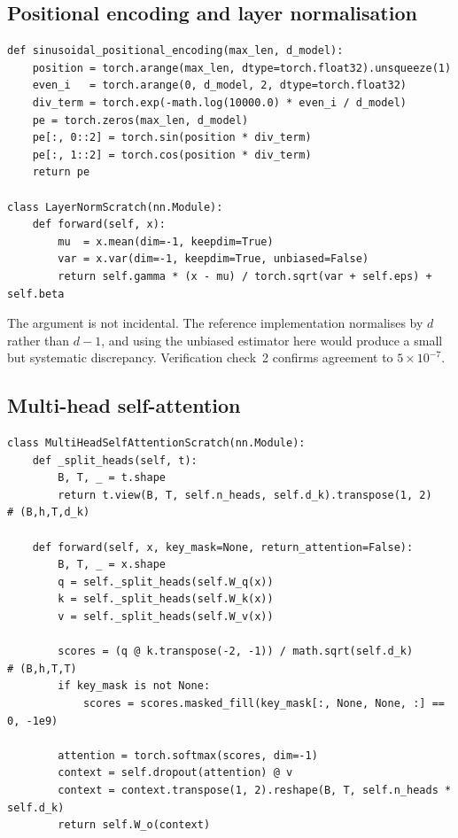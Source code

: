\subsection{Positional encoding and layer normalisation}

{\small
\begin{verbatim}
def sinusoidal_positional_encoding(max_len, d_model):
    position = torch.arange(max_len, dtype=torch.float32).unsqueeze(1)
    even_i   = torch.arange(0, d_model, 2, dtype=torch.float32)
    div_term = torch.exp(-math.log(10000.0) * even_i / d_model)
    pe = torch.zeros(max_len, d_model)
    pe[:, 0::2] = torch.sin(position * div_term)
    pe[:, 1::2] = torch.cos(position * div_term)
    return pe

class LayerNormScratch(nn.Module):
    def forward(self, x):
        mu  = x.mean(dim=-1, keepdim=True)
        var = x.var(dim=-1, keepdim=True, unbiased=False)
        return self.gamma * (x - mu) / torch.sqrt(var + self.eps) + self.beta
\end{verbatim}}

The  argument is not incidental. The reference implementation normalises by
$d$ rather than $d-1$, and using the unbiased estimator here would produce a small but systematic
discrepancy. Verification check~2 confirms agreement to $5\times10^{-7}$.

\subsection{Multi-head self-attention}

{\small
\begin{verbatim}
class MultiHeadSelfAttentionScratch(nn.Module):
    def _split_heads(self, t):
        B, T, _ = t.shape
        return t.view(B, T, self.n_heads, self.d_k).transpose(1, 2)   # (B,h,T,d_k)

    def forward(self, x, key_mask=None, return_attention=False):
        B, T, _ = x.shape
        q = self._split_heads(self.W_q(x))
        k = self._split_heads(self.W_k(x))
        v = self._split_heads(self.W_v(x))

        scores = (q @ k.transpose(-2, -1)) / math.sqrt(self.d_k)      # (B,h,T,T)
        if key_mask is not None:
            scores = scores.masked_fill(key_mask[:, None, None, :] == 0, -1e9)

        attention = torch.softmax(scores, dim=-1)
        context = self.dropout(attention) @ v
        context = context.transpose(1, 2).reshape(B, T, self.n_heads * self.d_k)
        return self.W_o(context)
\end{verbatim}}

